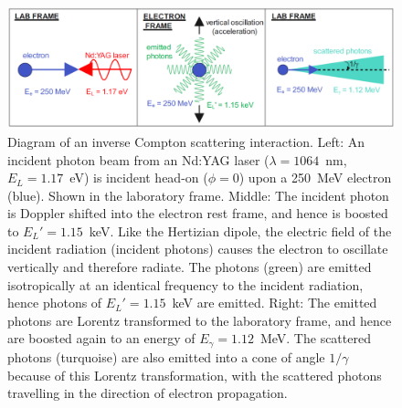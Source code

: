 \documentclass[../main.tex]{subfiles}
\begin{document}
\begin{figure}[!h]
\centering
\includegraphics[width=\textwidth]{Figures/Introduction/ICS_diagram_frames_fixed.pdf}
\caption{Diagram of an inverse Compton scattering interaction. Left: An incident photon beam from an Nd:YAG laser ($\lambda = 1064$~\si{\nano\meter}, $E_{L} = 1.17$~\si{\electronvolt}) is incident head-on ($\phi=0$) upon a 250~\si{\mega\electronvolt} electron (blue). Shown in the laboratory frame. Middle: The incident photon is Doppler shifted into the electron rest frame, and hence is boosted to $E_{L}' = 1.15$~\si{\kilo\electronvolt}. Like the Hertizian dipole, the electric field of the incident radiation (incident photons) causes the electron to oscillate vertically and therefore radiate. The photons (green) are emitted isotropically at an identical frequency to the incident radiation, hence photons of $E_{L}' = 1.15$~\si{\kilo\electronvolt} are emitted. Right: The emitted photons are Lorentz transformed to the laboratory frame, and hence are boosted again to an energy of $E_{\gamma} = 1.12$~\si{\mega\electronvolt}. The scattered photons (turquoise) are also emitted into a cone of angle $1/\gamma$ because of this Lorentz transformation, with the scattered photons travelling in the direction of electron propagation.}
\label{fig:ICS_frames_diagram}
\end{figure}
\end{document}

